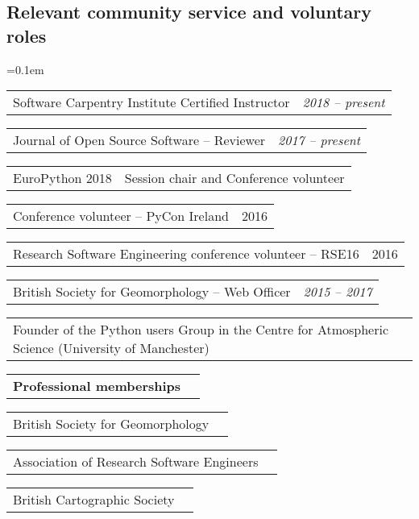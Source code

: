 \documentclass[10.5pt,a4]{article}
\makeatletter
\newenvironment{indentsection}[1]%
{\begin{list}{}%
	{\setlength{\leftmargin}{#1}}%
	\item[]%
}
{\end{list}}
\newcommand{\headerrow}[2]
{\begin{tabular*}{\linewidth}{l@{\extracolsep{\fill}}r}
	#1 &
	#2 \\
\end{tabular*}}
\makeatother
\begin{document}
\vspace{-0.4em}
\subsection*{Relevant community service and voluntary roles}
	\parskip=0.1em
\begin{itemize*}
	\item
	\headerrow
	  {Software Carpentry Institute Certified Instructor}
	  {\textit{2018 -- present}}


	\item
	\headerrow
	  {Journal of Open Source Software -- Reviewer}
	  {\textit{2017 -- present}}

	\item 
	\headerrow 
	  {EuroPython 2018}
	  {Session chair and Conference volunteer}
	  
	\item 
	\headerrow 
	  {Conference volunteer -- PyCon Ireland}
	  {2016}

	\item 
	\headerrow 
	  {Research Software Engineering conference volunteer -- RSE16}
	  {2016}
	  
	\item 
	\headerrow 
	  {British Society for Geomorphology -- Web Officer}
	  {\textit{2015 -- 2017}}

	\item 
	\headerrow 
	  {Founder of the Python users Group in the Centre for Atmospheric Science (University of Manchester)}
	  {\textit{}}




\end{itemize*}


\begin{itemize*}
	\item 
	\headerrow
		{\textbf{Professional memberships}}
		{}
	\headerrow {British Society for Geomorphology}{}
	\headerrow {Association of Research Software Engineers}{}
	\headerrow {British Cartographic Society}{}

\end{itemize*}

%
%
%
%
\end{document}
